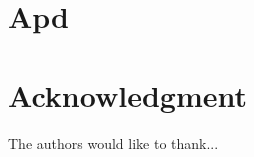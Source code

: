 \documentclass[conference]{IEEEtran}
\begin{document}
%


\appendices
\section{Apd }
\blindtext

\section*{Acknowledgment}


The authors would like to thank...


\ifCLASSOPTIONcaptionsoff
  \newpage
\fi




\end{document}
